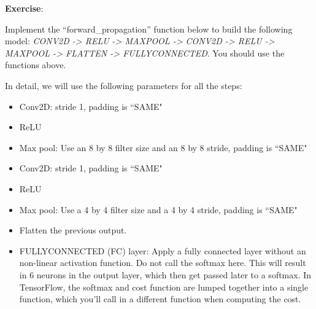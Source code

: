 {\textbf{Exercise}}:

Implement the ``forward\_propagation'' function below to build the following model: \emph{CONV2D -> RELU -> MAXPOOL -> CONV2D -> RELU -> MAXPOOL -> FLATTEN -> FULLYCONNECTED}. You should use the functions above. 

In detail, we will use the following parameters for all the steps:
\begin{itemize}
\item Conv2D: stride 1, padding is ``SAME"
\item ReLU
\item Max pool: Use an 8 by 8 filter size and an 8 by 8 stride, padding is ``SAME"
\item Conv2D: stride 1, padding is ``SAME"
\item ReLU
\item Max pool: Use a 4 by 4 filter size and a 4 by 4 stride, padding is ``SAME"
\item Flatten the previous output.
\item FULLYCONNECTED (FC) layer: Apply a fully connected layer without an non-linear activation function. Do not call the softmax here. This will result in 6 neurons in the output layer, which then get passed later to a softmax. In TensorFlow, the softmax and cost function are lumped together into a single function, which you'll call in a different function when computing the cost. 
\end{itemize} 
     
